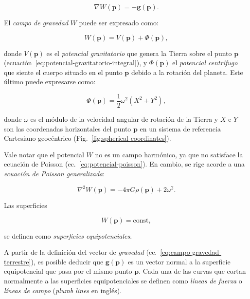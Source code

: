 \begin{equation}
    \nabla W(\mathbf{p}) = +\mathbf{g}(\mathbf{p}).
    \label{eq:campo-gravedad-terrestre}
\end{equation}

El \emph{campo de gravedad} $W$ puede ser expresado como:

\begin{equation}
    W(\mathbf{p}) = V(\mathbf{p}) + \Phi(\mathbf{p}),
\end{equation}

\noindent donde $V(\mathbf{p})$ es el \emph{potencial gravitatorio} que genera
la Tierra sobre el punto $\mathbf{p}$
(ecuación~\ref{eq:potencial-gravitatorio-integral}), y $\Phi(\mathbf{p})$ el
\emph{potencial centrífugo} que siente el cuerpo situado en el punto
$\mathbf{p}$ debido a la rotación del planeta.
Este último puede expresarse como:

\begin{equation}
    \Phi(\mathbf{p}) = \frac{1}{2} \omega^2 (X^2 + Y^2),
    \label{eq:potencial-centrifugo}
\end{equation}

\noindent donde $\omega$ es el módulo de la velocidad angular de rotación de la
Tierra y $X$ e $Y$ son las coordenadas horizontales del punto $\mathbf{p}$ en
un sistema de referencia Cartesiano geocéntrico
(Fig.~\ref{fig:spherical-coordinates}).

Vale notar que el potencial $W$ no es un campo harmónico, ya que no satisface
la ecuación de Poisson (ec.~\ref{eq:potencial-poisson}). En cambio, se rige
acorde a una \emph{ecuación de Poisson generalizada}:

\begin{equation}
    \nabla^2 W(\mathbf{p}) = - 4\pi G \rho(\mathbf{p}) + 2 \omega^2.
\end{equation}

Las superficies

\begin{equation}
    W(\mathbf{p}) = \text{const},
\end{equation}

\noindent se definen como \emph{superficies equipotenciales}.

A partir de la definición del vector de \emph{gravedad}
(ec.~\ref{eq:campo-gravedad-terrestre}), es posible deducir que
$\mathbf{g}(\mathbf{p})$ es un vector normal a la superficie equipotencial que
pasa por el mismo punto $\mathbf{p}$.
Cada una de las curvas que cortan normalmente a las superficies equipotenciales
se definen como \emph{líneas de fuerza} o \emph{líneas de campo}
(\emph{plumb lines} en inglés).

